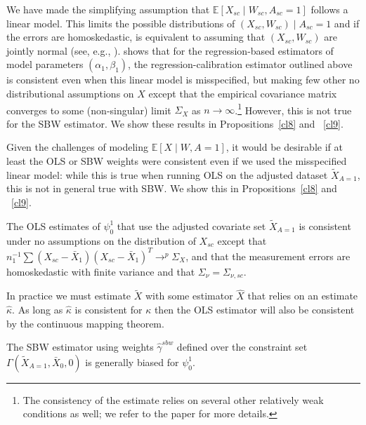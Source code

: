 \begin{remark}
    We have made the simplifying assumption that $\mathbb{E}[X_{sc} \mid W_{sc}, A_{sc} = 1]$ follows a linear model. This limits the possible distributions of $(X_{sc}, W_{sc}) \mid A_{sc} = 1$ and if the errors are homoskedastic, is equivalent to assuming that $(X_{sc}, W_{sc})$ are jointly normal (see, e.g., \cite{gleser1992importance}). \cite{gleser1992importance} shows that for the regression-based estimators of model parameters $(\alpha_1, \beta_1)$, the regression-calibration estimator outlined above is consistent even when this linear model is misspecified, but making few other no distributional assumptions on $X$ except that the empirical covariance matrix converges to some (non-singular) limit $\Sigma_X$ as $n \to \infty$.\footnote{The consistency of the estimate relies on several other relatively weak conditions as well; we refer to the paper for more details.} However, this is not true for the SBW estimator. We show these results in Propositions~\ref{cl8} and ~\ref{cl9}.
\end{remark}

Given the challenges of modeling $\mathbb{E}[X \mid W, A = 1]$, it would be desirable if at least the OLS or SBW weights were consistent even if we used the misspecified linear model: while this is true when running OLS on the adjusted dataset $\tilde{X}_{A=1}$, this is not in general true with SBW. We show this in Propositions~\ref{cl8} and ~\ref{cl9}.

\begin{proposition}\label{cl8}
    The OLS estimates of $\psi_0^1$ that use the adjusted covariate set $\tilde{X}_{A=1}$ is consistent under no assumptions on the distribution of $X_{sc}$ except that $n_1^{-1}\sum (X_{sc} - \bar{X}_1) (X_{sc} - \bar{X}_1)^T \to^p \Sigma_X$, and that the measurement errors are homoskedastic with finite variance and that $\Sigma_{\nu} = \Sigma_{\nu, sc}$. 
\end{proposition}


\begin{remark}
    In practice we must estimate $\tilde{X}$ with some estimator $\hat{X}$ that relies on an estimate $\hat{\kappa}$. As long as $\hat{\kappa}$ is consistent for $\kappa$ then the OLS estimator will also be consistent by the continuous mapping theorem.
\end{remark}


\begin{proposition}\label{cl9}
    The SBW estimator using weights $\hat{\gamma}^{sbw}$ defined over the constraint set $\Gamma(\tilde{X}_{A=1}, \bar{X}_0, 0)$ is generally biased for $\psi^1_0$.
\end{proposition}

